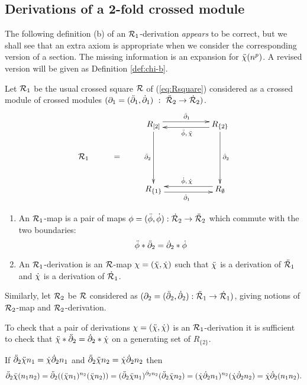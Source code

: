 \subsection{Derivations of a 2-fold crossed module} 
\label{subs:-der-xxmod}

The following definition (b) of an $\mathcal{R}_1$-derivation \emph{appears}
to be correct, but we shall see that an extra axiom is appropriate when 
we consider the corresponding version of a section.
The missing information is an expansion for $\ddot{\chi}(n^p)$.
A revised version will be given as Definition \ref{def:chi-b}.

\begin{defn} \label{def:chi-a}
Let ${\mathcal{R}_1}$ be the usual crossed square $\mathcal{R}$ of (\ref{eq:Rsquare}) 
considered as a crossed module of crossed modules  
$(\partial_1 = (\ddot{\partial}_1,\dot{\partial}_1) ~:~ \ddot{\mathcal{R}}_2 \to \dot{\mathcal{R}}_2)$.
\begin{equation} \label{eq:Rsqder}
\vcenter{\xymatrix{
        &   &    R_{[2]} \ar[rr] <+0.8ex>^{\ddbdyo} 
                         \ar[dd]_{\ddbdyt}
             &&  R_{\{2\}} \ar[ll] <+0.8ex>^{\ddph,\,\ddch} 
                           \ar[dd]^{\dbdyt} \\
\calR_1 & = &&&  \\
        &   &    R_{\{1\}} \ar[rr] <-0.8ex>_{\dbdyo}
             &&  R_{\emptyset} \ar[ll] <-0.8ex>_{\dph,\,\dch}
}} 
\end{equation}
\begin{enumerate}[\rm (a)]
\item 
An $\mathcal{R}_1$-map is a pair of maps 
$\phi = (\ddot{\phi}, \dot{\phi}) : \dot{\mathcal{R}}_2 \to \ddot{\mathcal{R}}_2$ which commute with the two 
boundaries:
$$ 
\ddot{\phi} \ast \ddot{\partial}_2 = \dot{\partial}_2 \ast \dot{\phi} 
$$
\item 
An $\mathcal{R}_1$-derivation is an $\mathcal{R}$-map $\chi = (\ddot{\chi}, \dot{\chi})$ 
such that $\ddot{\chi}$ is a derivation of $\ddot{\mathcal{R}}_1$ 
and $\dot{\chi}$ is a derivation of $\dot{\mathcal{R}}_1$.
\end{enumerate}

Similarly, let $\mathcal{R}_2$ be $\mathcal{R}$ considered as
$(\partial_2 = (\ddot{\partial}_2,\dot{\partial}_2) : \ddot{\mathcal{R}}_1 \to \dot{\mathcal{R}}_1)$,
giving notions of $\mathcal{R}_2$-map and $\mathcal{R}_2$-derivation.
\end{defn}

\begin{lem}
To check that a pair of derivations 
$\chi = (\ddot{\chi},\dot{\chi})$ is an $\mathcal{R}_1$-derivation
it is sufficient to check that $\ddot{\chi}\ast\ddot{\partial}_2 = \dot{\partial}_2\ast\dot{\chi}$
on a generating set of $R_{\{2\}}$.
\end{lem}
\begin{pf}
If $\ddot{\partial}_2\ddot{\chi} n_1 = \dot{\chi}\dot{\partial}_2 n_1$ 
and  $\ddot{\partial}_2\ddot{\chi} n_2 = \dot{\chi}\dot{\partial}_2 n_2$ then
$$
\ddot{\partial}_2\ddot{\chi}(n_1n_2)
= \ddot{\partial}_2((\ddot{\chi} n_1)^{n_2}(\ddot{\chi} n_2))
= (\ddot{\partial}_2\ddot{\chi} n_1)^{\dot{\partial}_2 n_2}(\ddot{\partial}_2\ddot{\chi} n_2)
= (\dot{\chi}\dot{\partial}_2 n_1)^{n_2}(\dot{\chi}\dot{\partial}_2 n_2)
= \dot{\chi}\dot{\partial}_2(n_1n_2).
$$ 
\end{pf}


